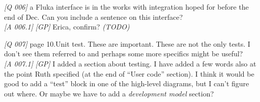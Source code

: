 \emph{{[}Q 006{]}} a Fluka interface is in the works with integration
hoped for before the end of Dec. Can you include a sentence on this
interface?\\
\emph{{[}A 006.1{]}} \emph{{[}GP{]}} Erica, confirm? \emph{(TODO)}

\emph{{[}Q 007{]}} page 10.Unit test. These are important. These are not
the only tests. I don't see them referred to and perhaps some more
specifics might be useful?\\
\emph{{[}A 007.1{]}} \emph{{[}GP{]}} I added a section about testing. I
have added a few words also at the point Ruth specified (at the end of
``User code'' section). I think it would be good to add a ``test'' block
in one of the high-level diagrams, but I can't figure out where. Or maybe we
have to add a \emph{development model} section?
